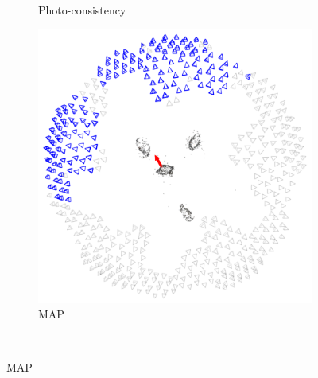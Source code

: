 \begin{figure}[t]
\begin{subfigure}{0.3\textwidth}
		\caption{Photo-consistency}
	\end{subfigure}
	\begin{subfigure}{0.3\textwidth}	
		\includegraphics[width=\textwidth]{figures/MAP}
		\caption{MAP}
	\end{subfigure}\\
	

\end{figure}
